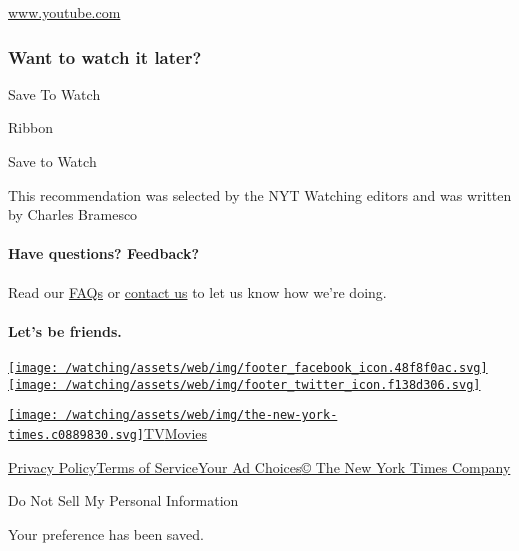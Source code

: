 \href{http://www.youtube.com}{www.youtube.com}

\hypertarget{want-to-watch-it-later}{%
\subsubsection{Want to watch it later?}\label{want-to-watch-it-later}}

Save To Watch

Ribbon

Save to Watch

This recommendation was selected by the NYT Watching editors and was
written by Charles Bramesco

\hypertarget{have-questions-feedback}{%
\paragraph{Have questions? Feedback?}\label{have-questions-feedback}}

Read our
\href{//www.nytimes3xbfgragh.onion/2017/01/10/watching/faq.html}{FAQs}
or \href{mailto:watchingcare@NYTimes.com}{contact us} to let us know how
we're doing.

\hypertarget{lets-be-friends}{%
\paragraph{Let's be friends.}\label{lets-be-friends}}

\href{https://www.facebookcorewwwi.onion/nytwatching/}{\texttt{[image: /watching/assets/web/img/footer\_facebook\_icon.48f8f0ac.svg]}}\href{https://twitter.com/watching}{\texttt{[image: /watching/assets/web/img/footer\_twitter\_icon.f138d306.svg]}}

\href{//www.nytimes3xbfgragh.onion}{\texttt{[image: /watching/assets/web/img/the-new-york-times.c0889830.svg]}}\href{//www.nytimes3xbfgragh.onion/section/arts/television}{TV}\href{//www.nytimes3xbfgragh.onion/section/movies}{Movies}

\href{//www.nytimes3xbfgragh.onion/content/help/rights/privacy/policy/privacy-policy.html}{Privacy
Policy}\href{//www.nytimes3xbfgragh.onion/content/help/rights/terms/terms-of-service.html}{Terms
of
Service}\href{//www.nytimes3xbfgragh.onion/content/help/rights/privacy/policy/privacy-policy.html\#pp}{Your
Ad Choices}\href{http://www.nytco.com/}{© The New York Times Company}

Do Not Sell My Personal Information

Your preference has been saved.
